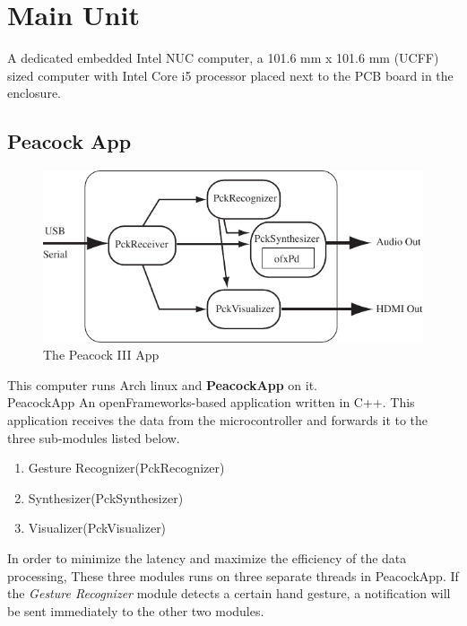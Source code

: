 \documentclass{nime-alternate}
\begin{document}
\section{Main Unit} %
A dedicated embedded Intel NUC computer\cite{intel:nuc}, a 101.6 mm x 101.6 mm (UCFF) sized computer with Intel Core i5 processor placed next to the PCB board in the enclosure.

\subsection{Peacock App}
\begin{figure}[htbp]
       \begin{center}
              \includegraphics[width=1\columnwidth]{Peacock_app.pdf}
       \end{center}
       \caption{The Peacock III App}
       \label{fig:modules}
\end{figure}

This computer runs Arch linux and {\bf PeacockApp} on it. \\
PeacockApp An openFrameworks\cite{openframeworks}-based application written in C++. This application receives the data from the microcontroller and forwards it to the three sub-modules listed below. 

\begin{enumerate}
       \item Gesture Recognizer(PckRecognizer)
       \item Synthesizer(PckSynthesizer)
       \item Visualizer(PckVisualizer)
\end{enumerate}

In order to minimize the latency and maximize the efficiency of the data processing, These three modules runs on three separate threads in PeacockApp. If the {\it Gesture Recognizer} module detects a certain hand gesture, a notification will be sent immediately to the other two modules.
\end{document}
